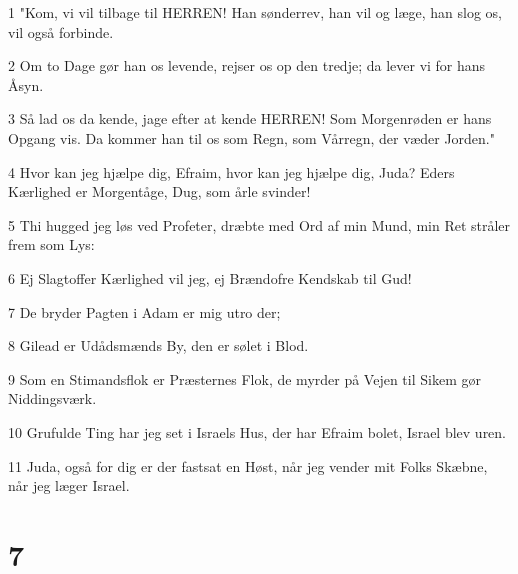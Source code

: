 \par 1 "Kom, vi vil tilbage til HERREN! Han sønderrev, han vil og læge, han slog os, vil også forbinde.
\par 2 Om to Dage gør han os levende, rejser os op den tredje; da lever vi for hans Åsyn.
\par 3 Så lad os da kende, jage efter at kende HERREN! Som Morgenrøden er hans Opgang vis. Da kommer han til os som Regn, som Vårregn, der væder Jorden."
\par 4 Hvor kan jeg hjælpe dig, Efraim, hvor kan jeg hjælpe dig, Juda? Eders Kærlighed er Morgentåge, Dug, som årle svinder!
\par 5 Thi hugged jeg løs ved Profeter, dræbte med Ord af min Mund, min Ret stråler frem som Lys:
\par 6 Ej Slagtoffer Kærlighed vil jeg, ej Brændofre Kendskab til Gud!
\par 7 De bryder Pagten i Adam er mig utro der;
\par 8 Gilead er Udådsmænds By, den er sølet i Blod.
\par 9 Som en Stimandsflok er Præsternes Flok, de myrder på Vejen til Sikem gør Niddingsværk.
\par 10 Grufulde Ting har jeg set i Israels Hus, der har Efraim bolet, Israel blev uren.
\par 11 Juda, også for dig er der fastsat en Høst, når jeg vender mit Folks Skæbne, når jeg læger Israel.

\chapter{7}

